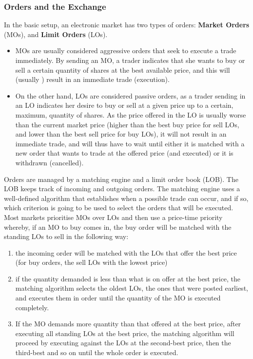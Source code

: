 \documentclass[11pt]{article}
\begin{document}
\subsubsection{Orders and the Exchange}
\label{sec:org8e2d367}
In the basic setup, an electronic market has two types of orders: \textbf{Market Orders} (MOs), and \textbf{Limit
Orders} (LOs).
\begin{itemize}
\item MOs are usually considered aggressive orders that seek to execute a trade immediately. By sending an
MO, a trader indicates that she wants to buy or sell a certain quantity of shares at the best
available price, and this will (usually ) result in an immediate trade (execution).
\item On the other hand, LOs are considered passive orders, as a trader sending in an LO indicates her
desire to buy or sell at a given price up to a certain, maximum, quantity of shares. As the price
offered in the LO is usually worse than the current market price (higher than the best buy price for
sell LOs, and lower than the best sell price for buy LOs), it will not result in an immediate trade,
and will thus have to wait until either it is matched with a new order that wants to trade at the
offered price (and executed) or it is withdrawn (cancelled).
\end{itemize}

Orders are managed by a matching engine and a limit order book (LOB). The LOB keeps track of incoming
and outgoing orders. The matching engine uses a well-defined algorithm that establishes when a
possible trade can occur, and if so, which criterion is going to be used to select the orders that
will be executed. Most markets prioritise MOs over LOs and then use a price-time priority whereby, if
an MO to buy comes in, the buy order will be matched with the standing LOs to sell in the following
way:
\begin{enumerate}
\item the incoming order will be matched with the LOs that offer the best price (for buy orders, the sell
LOs with the lowest price)
\item if the quantity demanded is less than what is on offer at the best price, the matching algorithm
selects the oldest LOs, the ones that were posted earliest, and executes them in order until the
quantity of the MO is executed completely.
\item If the MO demands more quantity than that offered at the best price, after executing all standing
LOs at the best price, the matching algorithm will proceed by executing against the LOs at the
second-best price, then the third-best and so on until the whole order is executed.
\end{enumerate}
\end{document}
